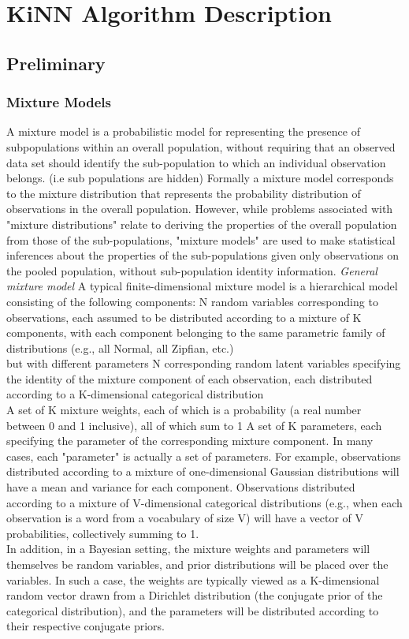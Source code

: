 \documentclass[a4paper]{article}
\begin{document}
\pagebreak
\section{KiNN Algorithm Description}
\subsection{Preliminary}
\subsubsection{Mixture Models}
A mixture model is a probabilistic model for representing the presence of subpopulations within an overall population, without requiring that an observed data set should identify the sub-population to which an individual observation belongs. (i.e sub populations are hidden)
Formally a mixture model corresponds to the mixture distribution that represents the probability distribution of observations in the overall population. However, while problems associated with "mixture distributions" relate to deriving the properties of the overall population from those of the sub-populations, "mixture models" are used to make statistical inferences about the properties of the sub-populations given only observations on the pooled population, without sub-population identity information.
\emph {General mixture model}
A typical finite-dimensional mixture model is a hierarchical model consisting of the following components:
N random variables corresponding to observations, each assumed to be distributed according to a mixture of K components, with each component belonging to the same parametric family of distributions (e.g., all Normal, all Zipfian, etc.)\\
 but with different parameters N corresponding random latent variables specifying the identity of the mixture component of each observation, each distributed according to a K-dimensional categorical distribution\\
A set of K mixture weights, each of which is a probability (a real number between 0 and 1 inclusive), all of which sum to 1
A set of K parameters, each specifying the parameter of the corresponding mixture component. In many cases, each "parameter" is actually a set of parameters. For example, observations distributed according to a mixture of one-dimensional Gaussian distributions will have a mean and variance for each component. Observations distributed according to a mixture of V-dimensional categorical distributions (e.g., when each observation is a word from a vocabulary of size V) will have a vector of V probabilities, collectively summing to 1.\\
In addition, in a Bayesian setting, the mixture weights and parameters will themselves be random variables, and prior distributions will be placed over the variables. In such a case, the weights are typically viewed as a K-dimensional random vector drawn from a Dirichlet distribution (the conjugate prior of the categorical distribution), and the parameters will be distributed according to their respective conjugate priors.
\end{document}
